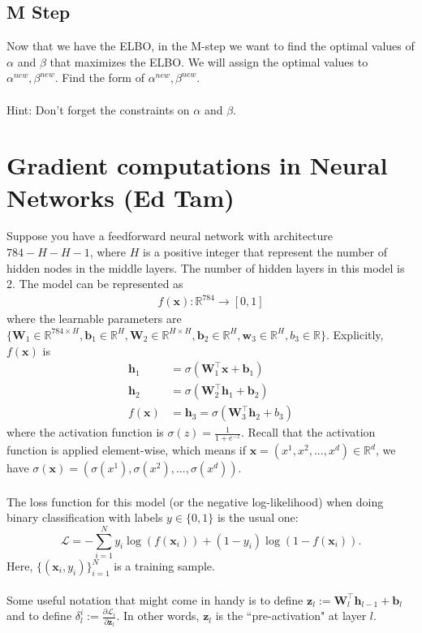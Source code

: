 \documentclass{exam}
\newcommand{\bv}[0]{{\boldsymbol{b}}}
\newcommand{\hv}[0]{{\boldsymbol{h}}}
\newcommand{\xv}{\boldsymbol{x}}
\newcommand{\zv}{\boldsymbol{z}}
\begin{document}
\subsection{M Step}
Now that we have the ELBO, in the M-step we want to find the optimal values of $\alpha$ and $\beta$ that maximizes the ELBO. We will assign the optimal values to $\alpha^{new},\beta^{new}$. Find the form of $\alpha^{new},\beta^{new}$.  
\\\\
Hint: Don't forget the constraints on $\alpha$ and $\beta$. 



\section{Gradient computations in Neural Networks (Ed Tam)}

Suppose you have a feedforward neural network with architecture $784-H-H-1$, where $H$ is a positive integer that represent the number of hidden nodes in the middle layers. The number of hidden layers in this model is 2. The model can be represented as 
\begin{align*}
f(\mathbf{x}) : \mathbb{R}^{784}\rightarrow [0,1]
\end{align*}
where the learnable parameters are $\{\mathbf{W}_1 \in \mathbb{R}^{784 \times H}, \mathbf{b}_1 \in \mathbb{R}^H, \mathbf{W}_2 \in \mathbb{R}^{H\times H}, \mathbf{b}_2 \in \mathbb{R}^H, \mathbf{w}_3 \in \mathbb{R}^{H}, b_3 \in \mathbb{R}\}$. Explicitly, $f(\mathbf{x})$ is
\begin{align*}
\mathbf{h}_1 &= \sigma\left( \mathbf{W}_1^\top \mathbf{x} + \mathbf{b}_1 \right) \\
\mathbf{h}_2 &= \sigma\left( \mathbf{W}_2^\top \mathbf{h}_1 + \mathbf{b}_2 \right) \\
f(\mathbf{x}) &= \mathbf{h}_3 =  \sigma\left( \mathbf{W}_3^\top \mathbf{h}_2 + b_3 \right) 
\end{align*}
where the activation function is $\sigma(z)=\frac{1}{1+e^{-z}}$. Recall that the activation function is applied element-wise, which means if $\mathbf{x}=(x^1,x^2,...,x^d)\in\mathbb{R}^d$, we have $\sigma(\mathbf{x}) = (\sigma(x^1), \sigma(x^2),...,\sigma(x^d))$. 
\\\\The loss function for this model (or the negative log-likelihood) when doing binary classification with labels $y \in \{0, 1\}$ is the usual one:
\[\mathcal{L}=-\sum_{i=1}^{N}y_i\log(f(\mathbf{x}_i)) + (1-y_i)\log(1-f(\mathbf{x}_i)).\]
Here, $\{(\xv_i, y_i)\}_{i = 1}^N$ is a training sample. 
\\\\Some useful notation that might come in handy is to define $\zv_l := \mathbf{W}_l^{\top} \hv_{l-1}+\bv_l$ and to define $\delta_l^i := \frac{\partial \mathcal{L}_i}{\partial \zv_l}$. In other words, $\zv_l$ is the ``pre-activation" at layer $l$. 
\end{document}

